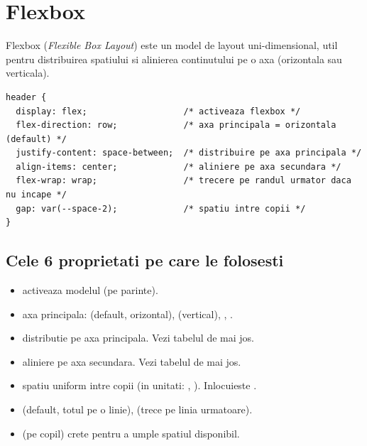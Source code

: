 \section{Flexbox}

Flexbox (\emph{Flexible Box Layout}) este un model de layout uni-dimensional, util pentru distribuirea spatiului si alinierea continutului pe o axa (orizontala sau verticala).

\begin{lstlisting}[style=css, caption={Header cu logo si navigare aliniate}]
header {
  display: flex;                   /* activeaza flexbox */
  flex-direction: row;             /* axa principala = orizontala (default) */
  justify-content: space-between;  /* distribuire pe axa principala */
  align-items: center;             /* aliniere pe axa secundara */
  flex-wrap: wrap;                 /* trecere pe randul urmator daca nu incape */
  gap: var(--space-2);             /* spatiu intre copii */
}
\end{lstlisting}

\subsection{Cele 6 proprietati pe care le folosesti}

\begin{itemize}[itemsep=2pt]
  \item {} \textendash{} activeaza modelul (pe parinte).
  \item {} \textendash{} axa principala:  (default, orizontal),  (vertical), , .
  \item {} \textendash{} distributie pe axa principala. Vezi tabelul de mai jos.
  \item {} \textendash{} aliniere pe axa secundara. Vezi tabelul de mai jos.
  \item {} \textendash{} spatiu uniform intre copii (in unitati: , \code{16px}). Inlocuieste .
  \item {} \textendash{}  (default, totul pe o linie),  (trece pe linia urmatoare).
  \item {} (pe copil) \textendash{} crete pentru a umple spatiul disponibil.
\end{itemize}

